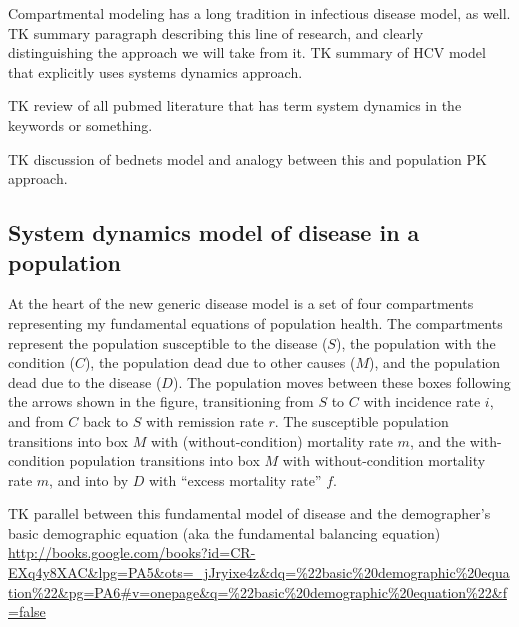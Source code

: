 Compartmental modeling has a long tradition in infectious disease
model, as well. TK summary paragraph describing this line of research,
and clearly distinguishing the approach we will take from it. TK
summary of HCV model that explicitly uses systems dynamics approach.

TK review of all pubmed literature that has term system dynamics in
the keywords or something.

TK discussion of bednets model and analogy between this and population
PK approach.

\subsection{System dynamics model of disease in a population}
At the heart of the new generic disease model is a set of four
compartments representing my fundamental equations of population
health. The compartments represent the population susceptible to the
disease ($S$), the population with the condition ($C$), the population
dead due to other causes ($M$), and the population dead due to the
disease ($D$). The population moves between these boxes following the
arrows shown in the figure, transitioning from $S$ to $C$ with incidence
rate $i$, and from $C$ back to $S$ with remission rate $r$. The susceptible
population transitions into box $M$ with (without-condition) mortality
rate $m$, and the with-condition population transitions into box $M$ with
without-condition mortality rate $m$, and into by $D$ with ``excess
mortality rate'' $f$.

TK parallel between this fundamental model of disease and the demographer's
 basic demographic equation (aka the fundamental balancing equation)
 \url{http://books.google.com/books?id=CR-EXq4y8XAC&lpg=PA5&ots=_jJryixe4z&dq=%22basic%20demographic%20equation%22&pg=PA6#v=onepage&q=%22basic%20demographic%20equation%22&f=false}


